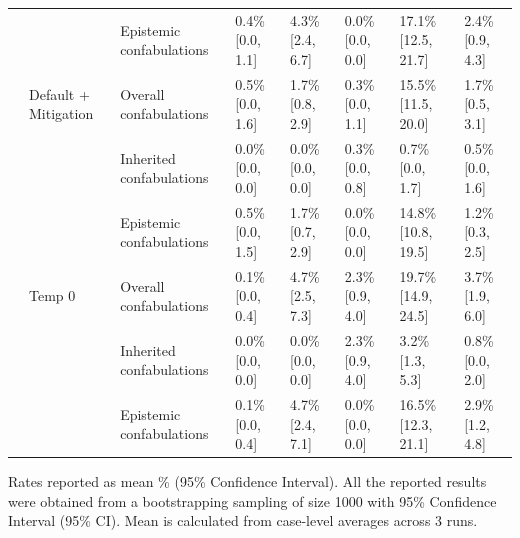 \begin{tabular}{llllllll}
 &  & Epistemic confabulations & 0.4\% [0.0, 1.1] & 4.3\% [2.4, 6.7] & 0.0\% [0.0, 0.0] & 17.1\% [12.5, 21.7] & 2.4\% [0.9, 4.3] \\
 & Default + Mitigation & Overall confabulations & 0.5\% [0.0, 1.6] & 1.7\% [0.8, 2.9] & 0.3\% [0.0, 1.1] & 15.5\% [11.5, 20.0] & 1.7\% [0.5, 3.1] \\
 &  & Inherited confabulations & 0.0\% [0.0, 0.0] & 0.0\% [0.0, 0.0] & 0.3\% [0.0, 0.8] & 0.7\% [0.0, 1.7] & 0.5\% [0.0, 1.6] \\
 &  & Epistemic confabulations & 0.5\% [0.0, 1.5] & 1.7\% [0.7, 2.9] & 0.0\% [0.0, 0.0] & 14.8\% [10.8, 19.5] & 1.2\% [0.3, 2.5] \\
 & Temp 0 & Overall confabulations & 0.1\% [0.0, 0.4] & 4.7\% [2.5, 7.3] & 2.3\% [0.9, 4.0] & 19.7\% [14.9, 24.5] & 3.7\% [1.9, 6.0] \\
 &  & Inherited confabulations & 0.0\% [0.0, 0.0] & 0.0\% [0.0, 0.0] & 2.3\% [0.9, 4.0] & 3.2\% [1.3, 5.3] & 0.8\% [0.0, 2.0] \\
 &  & Epistemic confabulations & 0.1\% [0.0, 0.4] & 4.7\% [2.4, 7.1] & 0.0\% [0.0, 0.0] & 16.5\% [12.3, 21.1] & 2.9\% [1.2, 4.8] \\
\bottomrule
\end{tabular}

\medskip
\noindent


Rates reported as mean \% (95\% Confidence Interval). All the reported results were obtained from a bootstrapping sampling of size 1000 with 95\% Confidence Interval (95\% CI). Mean is calculated from case-level averages across 3 runs.
